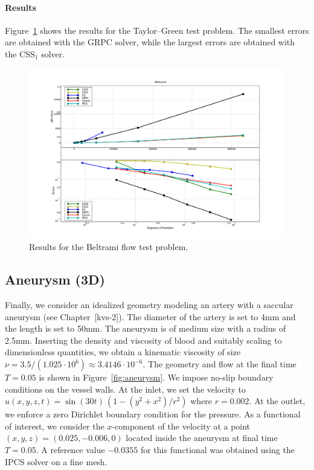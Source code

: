 \paragraph{Results}

Figure~\ref{fig:beltrami_res} shows the results for the Taylor--Green
test problem. The smallest errors are obtained with the GRPC solver,
while the largest errors are obtained with the $\mathrm{CSS}_1$
solver.

\begin{figure}
  \begin{center}
    \includegraphics[width=14cm]{chapters/kvs-1/pdf/new_beltrami_res.pdf}
    \caption{Results for the Beltrami flow test problem.}
    \label{fig:beltrami_res}
  \end{center}
\end{figure}

\subsection{Aneurysm (3D)}

Finally, we consider an idealized geometry modeling an artery with a
saccular aneu\-rysm (see Chapter~[kvs-2]). The diameter of the artery
is set to 4mm and the length is set to 50mm. The aneurysm is of medium
size with a radius of 2.5mm. Inserting the density and viscosity of
blood and suitably scaling to dimensionless quantities, we obtain a
kinematic viscosity of size $\nu = 3.5 / (1.025 \cdot 10^6) \approx
3.4146 \cdot 10^{-6}$. The geometry and flow at the final time $T =
0.05$ is shown in Figure~\ref{fig:aneurysm}. We impose no-slip
boundary conditions on the vessel walls. At the inlet, we set the
velocity to $u(x, y, z, t) = \sin(30 t) \, (1 - (y^2 + x^2) / r^2)$
where $r = 0.002$. At the outlet, we enforce a zero Dirichlet boundary
condition for the pressure. As a functional of interest, we consider
the $x$-component of the velocity at a point $(x, y, z) = (0.025,
-0.006, 0)$ located inside the aneurysm at final time $T = 0.05$. A
reference value $-0.0355$ for this functional was obtained using the
IPCS solver on a fine mesh.

